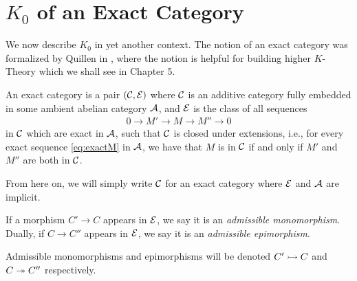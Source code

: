 

\section{$K_0$ of an Exact Category}
We now describe $K_0$ in yet another context.
The notion of an exact category was formalized by Quillen in \cite{Quillen1973}, where the notion 
is helpful for building higher $K$-Theory which we shall see in Chapter 5.

\begin{definition}
An exact category is a pair $(\mathcal{C},\mathcal{E})$ where $\mathcal{C}$ is an additive category fully embedded in some ambient abelian category $\mathcal{A}$,
and $\mathcal{E}$ is the class of all sequences
\begin{align} \label{eq:exactM}
0 \to M' \to M \to M'' \to 0
\end{align}
in $\mathcal{C}$ which are exact in $\mathcal{A}$, such that $\mathcal{C}$ is closed under extensions, i.e.,
for every exact sequence \eqref{eq:exactM} in $\mathcal{A}$, we have that
$M$ is in $\mathcal{C}$ if and only if $M'$ and $M''$ are both in $\mathcal{C}$.
\end{definition}

From here on, we will simply write $\mathcal{C}$ for an exact category where $\mathcal{E}$ and $\mathcal{A}$ are implicit. 
\begin{definition}
If a morphism $C' \to C$ appears in $\mathcal{E}$, we say it is an \emph{admissible monomorphism}.
Dually, if $C \to C''$ appears in $\mathcal{E}$, we say it is an \emph{admissible epimorphism}.

Admissible monomorphisms and epimorphisms will be denoted
$ C' \rightarrowtail C$ and $C \twoheadrightarrow C''$ respectively.
\end{definition}


